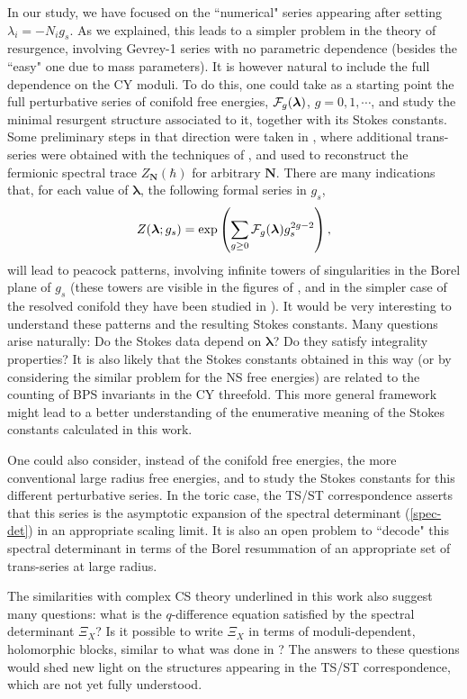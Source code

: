 \documentclass[a4paper,11pt]{article}
\theoremstyle{definition}
\newcommand{\CF}{{\cal F}}
\def\blambda{\boldsymbol{\lambda}}
\def\bN{{\boldsymbol{N}}}
\newcommand{\be}{\begin{equation}}
\newcommand{\ee}{\end{equation}}
\begin{document}
In our study, we have focused on the ``numerical" series appearing after setting $\lambda_i=-N_i g_s$. As we explained,  
this leads to a simpler problem in the theory of resurgence, involving Gevrey-1 series with no parametric dependence 
(besides the ``easy" one due to mass parameters). It is however natural to include the full dependence on the CY moduli. 
To do this, one could take as a starting point the full perturbative series of conifold free energies, 
$\CF_g(\blambda)$, $g=0,1, \cdots$, and study 
the minimal resurgent structure associated to it, together with its Stokes constants. Some preliminary steps in 
that direction were taken in \cite{cms}, 
where additional trans-series were obtained with the techniques of \cite{cesv1,cesv2}, and used to reconstruct the fermionic spectral trace 
$Z_{\bN}(\hbar)$ for arbitrary $\bN$. There are many indications that, for each value of $\blambda$, the following formal series in $g_s$,
%
\be
\label{zcon}
Z(\blambda;g_s)= \exp \left( \sum_{g \ge 0} \CF_g(\blambda) g_s^{2g-2} \right),
\ee
%
will lead to peacock patterns, involving infinite towers of singularities in the Borel plane of $g_s$ 
(these towers are visible in the figures of \cite{cms}, and in the simpler case of the resolved conifold they have been studied in \cite{ps09}). 
It would be very interesting to understand these patterns and the resulting Stokes constants. Many questions arise naturally: 
Do the Stokes data depend on $\blambda$? Do they satisfy integrality properties? It is also likely that the Stokes constants 
obtained in this way (or by considering the similar problem for the NS free energies) 
are related to the counting of BPS invariants in the CY threefold. This more general framework might lead to a better understanding of the 
enumerative meaning of the Stokes constants calculated in this work.  

One could also consider, instead of the conifold free energies, the more conventional large radius free energies, 
and to study the Stokes constants for this different perturbative series. In the toric case, the TS/ST correspondence asserts that this series is the asymptotic expansion of the spectral determinant (\ref{spec-det}) in an appropriate scaling limit. It is also an 
open problem to ``decode" this spectral determinant in terms of the Borel resummation of an appropriate set of trans-series at large radius. 

The similarities with complex CS theory underlined in this work also suggest many questions: what is the $q$-difference 
equation satisfied by the spectral determinant $\Xi_X$? Is it 
possible to write $\Xi_X$ in terms of moduli-dependent, holomorphic blocks, similar to what was done in \cite{bdp,ggm2}? The answers 
to these questions would shed new light on the structures appearing in the TS/ST correspondence, which are not yet fully understood. 
\end{document}
